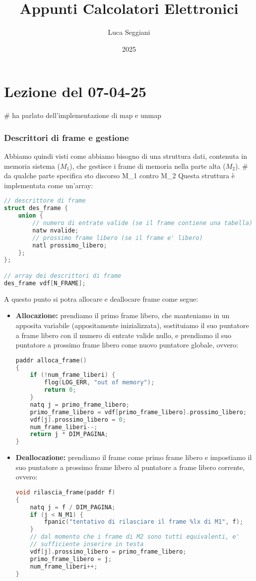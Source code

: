\documentclass[a4paper,11pt]{article}
\title{Appunti Calcolatori Elettronici}
\author{Luca Seggiani}
\date{2025}
\begin{document}
\section{Lezione del 07-04-25}

\thispagestyle{empty}
\pagestyle{fancy}


# ha parlato dell'implementazione di map e unmap

\subsubsection{Descrittori di frame e gestione}
Abbiamo quindi visti come abbiamo bisogno di una struttura dati, contenuta in memoria sistema ($M_1$), che gestisce i frame di memoria nella parte alta ($M_2$). 
# da qualche parte specifica sto discorso M\_1 contro M\_2
Questa struttura è implementata come un'array:
\begin{lstlisting}[language=C++, style=codestyle]	
// descrittore di frame
struct des_frame {
	union {
		// numero di entrate valide (se il frame contiene una tabella)
		natw nvalide;
		// prossimo frame libero (se il frame e' libero)
		natl prossimo_libero;
	};
};

// array dei descrittori di frame
des_frame vdf[N_FRAME];
\end{lstlisting}

A questo punto si potra allocare e deallocare frame come segue:
\begin{itemize}
	\item \textbf{Allocazione:} prendiamo il primo frame libero, che manteniamo in un apposita variabile (appositamente inizializzata), sostituiamo il suo puntatore a frame libero con il numero di entrate valide nullo, e prendiamo il suo puntatore a prossimo frame libero come nuovo puntatore globale, ovvero:
\begin{lstlisting}[language=C++, style=codestyle]			
paddr alloca_frame()
{
	if (!num_frame_liberi) {
		flog(LOG_ERR, "out of memory");
		return 0;
	}
	natq j = primo_frame_libero;
	primo_frame_libero = vdf[primo_frame_libero].prossimo_libero;
	vdf[j].prossimo_libero = 0;
	num_frame_liberi--;
	return j * DIM_PAGINA;
}
\end{lstlisting}

	\item \textbf{Deallocazione:} prendiamo il frame come primo frame libero e impostiamo il suo puntatore a prossimo frame libero al puntatore a frame libero corrente, ovvero:
\begin{lstlisting}[language=C++, style=codestyle]	
void rilascia_frame(paddr f)
{
	natq j = f / DIM_PAGINA;
	if (j < N_M1) {
		fpanic("tentativo di rilasciare il frame %lx di M1", f);
	}
	// dal momento che i frame di M2 sono tutti equivalenti, e'
	// sufficiente inserire in testa
	vdf[j].prossimo_libero = primo_frame_libero;
	primo_frame_libero = j;
	num_frame_liberi++;
}
\end{lstlisting}
\end{itemize}
\end{document}
